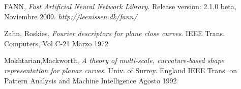 \documentclass[pdftex,a4paper,10.5pt]{article}
\begin{document}
\begin{thebibliography}{9}
  FANN, 
  \emph{Fast Artificial Neural Network Library}. 
  Release version: 2.1.0 beta, 
  Noviembre 2009.
  \textsl{http://leenissen.dk/fann/}
 
  Zahn, Roskies, 
  \emph{Fourier descriptors for plane close curves}. 
  IEEE Trans. Computers, Vol C-21
  Marzo 1972

 Mokhtarian,Mackworth,
  \emph{A theory of multi-scale, curvature-based shape representation for planar curves}. 
  Univ. of Surrey. England
  IEEE Trans. on Pattern Analysis and Machine Intelligence
  Agosto 1992
  
\end{thebibliography}

\end{document}
